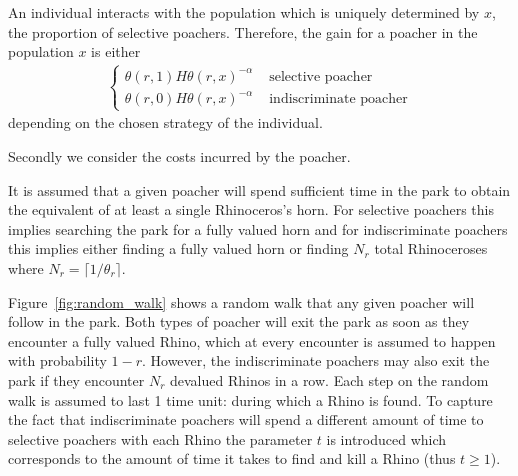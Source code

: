 \documentclass[10pt]{article}
\begin{document}
An individual interacts with the population which is uniquely determined by
\(x\), the proportion of selective poachers.
Therefore, the gain for a poacher in the population \(x\) is either
\begin{eqnarray}
    \label{eqn:gain}
    \left\{
    \begin{array}{cl}
    \theta(r, 1) H \theta(r, x)^{-\alpha} & \mbox{ selective poacher}
    \\
    \theta(r, 0) H \theta(r, x)^{-\alpha} & \mbox{ indiscriminate poacher}
    \end{array} \right.
\end{eqnarray}
depending on the chosen strategy of the individual.

Secondly we consider the costs incurred by the poacher.

It is assumed that a given poacher will spend sufficient time in the park to
obtain the equivalent of at least a single Rhinoceros's horn. For selective poachers this
implies searching the park for a fully valued horn and for indiscriminate
poachers this implies either finding a fully valued horn or finding \(N_r\)
total Rhinoceroses where \(N_r = \lceil 1 / \theta_r \rceil\).

Figure~\ref{fig:random_walk} shows a random walk that any given poacher will
follow in the park. Both types of poacher will exit the park as soon as they
encounter a fully valued Rhino, which at every encounter is assumed to happen
with probability \(1 - r\). However, the indiscriminate poachers may also exit
the park if they encounter \(N_r\) devalued Rhinos in a row.  Each step on the
random walk is assumed to last 1 time unit: during which a Rhino is found.  To
capture the fact that indiscriminate poachers will spend a different amount of
time to selective poachers with each Rhino the parameter \(t\) is introduced
which corresponds to the amount of time it takes to find and kill a Rhino (thus
\(t\geq 1\)).
\end{document}
